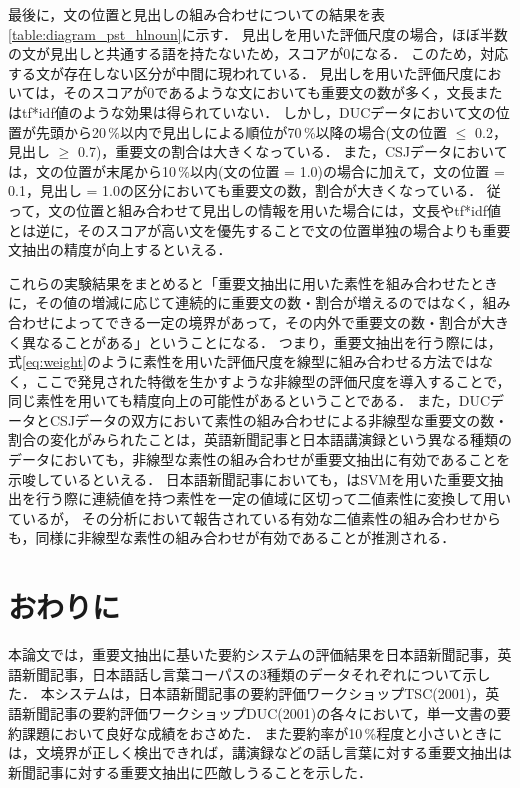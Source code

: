 最後に，文の位置と見出しの組み合わせについての結果を表\ref{table:diagram_pst_hlnoun}に示す．
見出しを用いた評価尺度の場合，ほぼ半数の文が見出しと共通する語を持たないため，スコアが0になる．
このため，対応する文が存在しない区分が中間に現われている．
見出しを用いた評価尺度においては，そのスコアが0であるような文においても重要文の数が多く，文長またはtf*idf値のような効果は得られていない．
しかし，DUCデータにおいて文の位置が先頭から20\,\%以内で見出しによる順位が70\,\%以降の場合(文の位置 \(\le\) 0.2，見出し \(\ge\) 0.7)，重要文の割合は大きくなっている．
また，CSJデータにおいては，文の位置が末尾から10\,\%以内(文の位置 = 1.0)の場合に加えて，文の位置 = 0.1，見出し = 1.0の区分においても重要文の数，割合が大きくなっている．
従って，文の位置と組み合わせて見出しの情報を用いた場合には，文長やtf*idf値とは逆に，そのスコアが高い文を優先することで文の位置単独の場合よりも重要文抽出の精度が向上するといえる．

これらの実験結果をまとめると「重要文抽出に用いた素性を組み合わせたときに，その値の増減に応じて連続的に重要文の数・割合が増えるのではなく，組み合わせによってできる一定の境界があって，その内外で重要文の数・割合が大きく異なることがある」ということになる．
つまり，重要文抽出を行う際には，式\ref{eq:weight}のように素性を用いた評価尺度を線型に組み合わせる方法ではなく，ここで発見された特徴を生かすような非線型の評価尺度を導入することで，同じ素性を用いても精度向上の可能性があるということである．
また，DUCデータとCSJデータの双方において素性の組み合わせによる非線型な重要文の数・割合の変化がみられたことは，英語新聞記事と日本語講演録という異なる種類のデータにおいても，非線型な素性の組み合わせが重要文抽出に有効であることを示唆しているといえる．
日本語新聞記事においても，\cite{hirao:phdthesis}はSVMを用いた重要文抽出を行う際に連続値を持つ素性を一定の値域に区切って二値素性に変換して用いているが，
その分析において報告されている有効な二値素性の組み合わせからも，同様に非線型な素性の組み合わせが有効であることが推測される．


\section{おわりに}

本論文では，重要文抽出に基いた要約システムの評価結果を日本語新聞記事，英語新聞記事，日本語話し言葉コーパスの3種類のデータそれぞれについて示した．
本システムは，日本語新聞記事の要約評価ワークショップTSC(2001)，英語新聞記事の要約評価ワークショップDUC(2001)の各々において，単一文書の要約課題において良好な成績をおさめた．
また要約率が10\,\%程度と小さいときには，文境界が正しく検出できれば，講演録などの話し言葉に対する重要文抽出は新聞記事に対する重要文抽出に匹敵しうることを示した．

